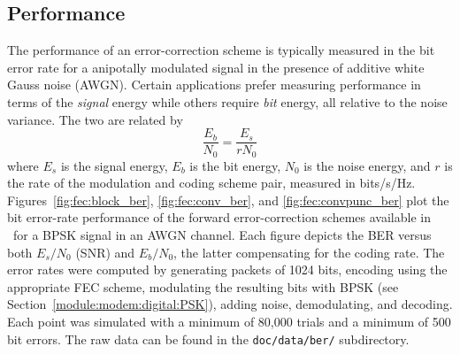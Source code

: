
\subsection{Performance}
\label{module:fec:performance}
The performance of an error-correction scheme is typically measured in
the bit error rate for a anipotally modulated signal in the presence of
additive white Gauss noise (AWGN).
Certain applications prefer measuring performance in terms of the
{\em signal} energy while others require {\em bit} energy,
all relative to the noise variance.
The two are related by
%
\begin{equation}
\label{eqn:fec:esn0_ebn0}
    \frac{E_b}{N_0} = \frac{E_s}{r N_0}
\end{equation}
%
where
$E_s$ is the signal energy,
$E_b$ is the bit energy,
$N_0$ is the noise energy,
and
$r$ is the rate of the modulation and coding scheme pair,
measured in bits/s/Hz.
Figures~\ref{fig:fec:block_ber}, \ref{fig:fec:conv_ber}, and
\ref{fig:fec:convpunc_ber}
plot the bit error-rate performance of the forward
error-correction schemes available in \liquid\ for a BPSK signal
in an AWGN channel.
Each figure depicts the BER versus both $E_s/N_0$ (SNR) and $E_b/N_0$,
the latter compensating for the coding rate.
The error rates were computed by generating packets of 1024 bits,
encoding using the appropriate FEC scheme,
modulating the resulting bits with BPSK
(see Section~\ref{module:modem:digital:PSK}),
adding noise, demodulating, and decoding.
Each point was simulated with a minimum of 80,000 trials and a minimum
of 500 bit errors.
The raw data can be found in the {\tt doc/data/ber/} subdirectory.

